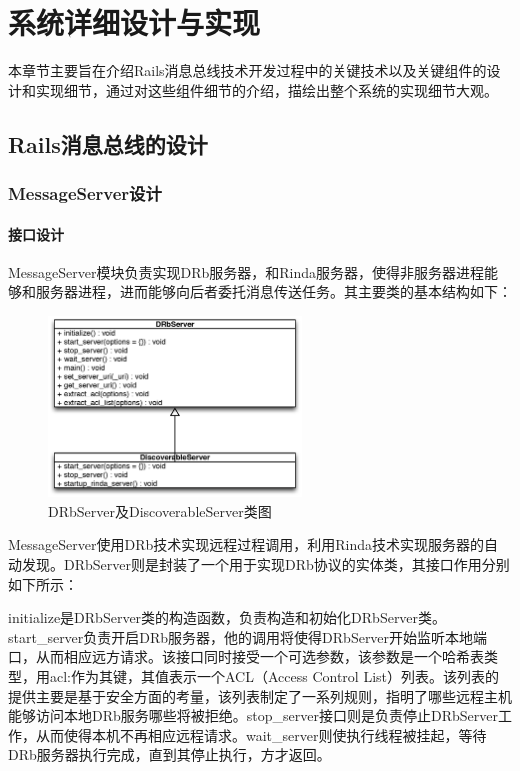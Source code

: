 \chapter{系统详细设计与实现}

本章节主要旨在介绍Rails消息总线技术开发过程中的关键技术以及关键组件的设计和实现细节，通过对这些组件细节的介绍，描绘出整个系统的实现细节大观。

\section{Rails消息总线的设计}

\subsection{MessageServer设计}
\subsubsection{接口设计}
MessageServer模块负责实现DRb服务器，和Rinda服务器，使得非服务器进程能够和服务器进程，进而能够向后者委托消息传送任务。其主要类的基本结构如下：

\begin{figure}[h]
\centering
\includegraphics[width=0.6\textwidth]{images/detail/drbserver_class.eps}
\caption{DRbServer及DiscoverableServer类图}
\label{fig-drb-class}
\end{figure}

MessageServer使用DRb技术实现远程过程调用，利用Rinda技术实现服务器的自动发现。DRbServer则是封装了一个用于实现DRb协议的实体类，其接口作用分别如下所示：

initialize是DRbServer类的构造函数，负责构造和初始化DRbServer类。start\_server负责开启DRb服务器，他的调用将使得DRbServer开始监听本地端口，从而相应远方请求。该接口同时接受一个可选参数，该参数是一个哈希表类型，用acl:作为其键，其值表示一个ACL（Access Control List）列表。该列表的提供主要是基于安全方面的考量，该列表制定了一系列规则，指明了哪些远程主机能够访问本地DRb服务哪些将被拒绝。stop\_server接口则是负责停止DRbServer工作，从而使得本机不再相应远程请求。wait\_server则使执行线程被挂起，等待DRb服务器执行完成，直到其停止执行，方才返回。

